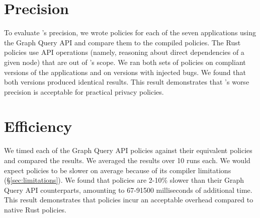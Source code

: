 \section{Precision}
\label{sec:precision}
To evaluate \syslang's precision, we wrote policies for each of the seven applications using the Graph Query API and compare them to the compiled \syslang{} policies.
%
The Rust policies use API operations (namely, reasoning about direct dependencies of a given node) that are out of \syslang's scope.
%
We ran both sets of policies on compliant versions of the applications and on versions with injected bugs.
%
We found that both versions produced identical results.
%
This result demonstrates that \syslang's worse precision is acceptable for practical privacy policies.

\section{Efficiency}
\label{sec:efficiency}
We timed each of the Graph Query API policies against their equivalent \syslang{} policies and compared the results.
%
We averaged the results over 10 runs each.
%
We would expect \syslang{} policies to be slower on average because of its compiler limitations (\S\ref{sec:limitations}).
%
We found that \syslang{} policies are 2-10\% slower than their Graph Query API counterparts,
amounting to 67-91500 milliseconds of additional time.
%
This result demonstrates that \syslang{} policies incur an acceptable overhead compared to native Rust policies.
